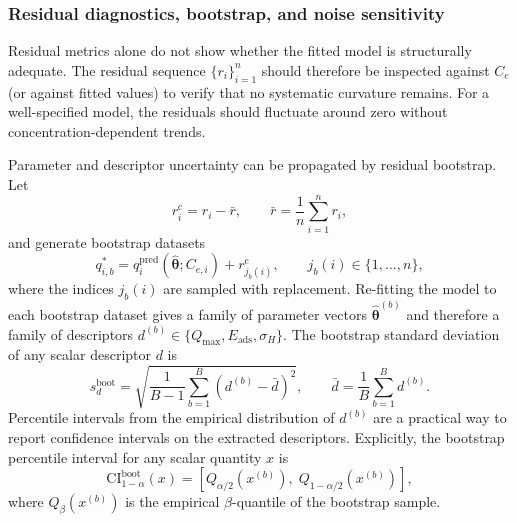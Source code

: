 \documentclass[journal=jacsat,manuscript=article]{achemso}
\begin{document}
\subsubsection{Residual diagnostics, bootstrap, and noise sensitivity}

Residual metrics alone do not show whether the fitted model is
structurally adequate. The residual sequence
$\{r_i\}_{i=1}^{n}$ should therefore be inspected against $C_e$ (or
against fitted values) to verify that no systematic curvature remains.
For a well-specified model, the residuals should fluctuate around zero
without concentration-dependent trends.

Parameter and descriptor uncertainty can be propagated by residual
bootstrap. Let
\begin{equation}
	r_i^{\mathrm{c}} = r_i - \bar{r},
	\qquad
	\bar{r} = \frac{1}{n}\sum_{i=1}^{n} r_i,
	\label{eq:si_centered_residuals}
\end{equation}
and generate bootstrap datasets
\begin{equation}
	q_{i,b}^{\ast}
	=
	q_i^{\mathrm{pred}}(\hat{\boldsymbol{\theta}}; C_{e,i})
	+
	r_{j_b(i)}^{\mathrm{c}},
	\qquad
	j_b(i) \in \{1,\dots,n\},
	\label{eq:si_bootstrap_dataset}
\end{equation}
where the indices $j_b(i)$ are sampled with replacement. Re-fitting the
model to each bootstrap dataset gives a family of parameter vectors
$\hat{\boldsymbol{\theta}}^{(b)}$ and therefore a family of descriptors
$d^{(b)} \in \{Q_{\max}, E_{\mathrm{ads}}, \sigma_H\}$. The bootstrap
standard deviation of any scalar descriptor $d$ is
\begin{equation}
	s_d^{\mathrm{boot}}
	=
	\sqrt{
	\frac{1}{B-1}
	\sum_{b=1}^{B}
	\left(d^{(b)} - \bar{d}\right)^2},
	\qquad
	\bar{d} = \frac{1}{B}\sum_{b=1}^{B} d^{(b)}.
	\label{eq:si_bootstrap_sd}
\end{equation}
Percentile intervals from the empirical distribution of $d^{(b)}$ are a
practical way to report confidence intervals on the extracted
descriptors.
Explicitly, the bootstrap percentile interval for any scalar quantity
$x$ is
\begin{equation}
	\mathrm{CI}^{\mathrm{boot}}_{1-\alpha}(x)
	=
	\left[
	Q_{\alpha/2}\!\left(x^{(b)}\right),\;
	Q_{1-\alpha/2}\!\left(x^{(b)}\right)
	\right],
	\label{eq:si_bootstrap_CI}
\end{equation}
where $Q_{\beta}(x^{(b)})$ is the empirical $\beta$-quantile of the
bootstrap sample.
\end{document}
